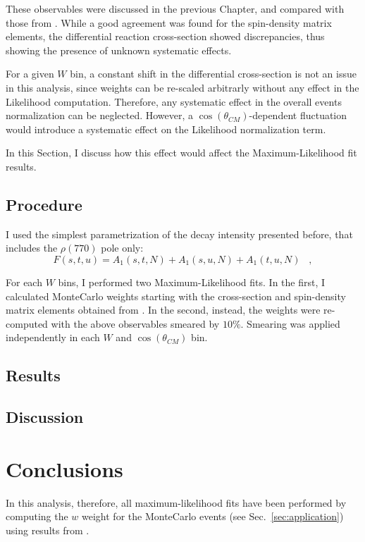 \documentclass[a4paper,10pt]{report}
\begin{document}
These observables were discussed in the previous Chapter, and compared with those from \cite{Williams:2009ab}. While a good agreement was found for the spin-density matrix elements, the differential reaction cross-section showed discrepancies, thus showing the presence of
unknown systematic effects.

For a given $W$ bin, a constant shift in the differential cross-section is not an issue in this analysis, since weights can be re-scaled arbitrarly without any effect in the Likelihood
computation. Therefore, any systematic effect in the overall events normalization can be neglected. 
However, a $\cos(\theta_{CM})$-dependent fluctuation would introduce a systematic effect on the Likelihood normalization term. 

In this Section, I discuss how this effect would affect the Maximum-Likelihood fit results.

\subsection{Procedure}

I used the simplest parametrization of the decay intensity presented before, that includes the $\rho(770)$ pole only:
\begin{equation}
F(s,t,u)=A_1(s,t,N)+A_1(s,u,N)+A_1(t,u,N) \; \; \; ,
\end{equation}

For each $W$ bins, I performed two Maximum-Likelihood fits. In the first, I calculated MonteCarlo weights starting with the cross-section and spin-density matrix elements obtained from \cite{Williams:2009ab}.
In the second, instead, the weights were re-computed with the above observables smeared by $10\%$. Smearing was applied independently in each $W$ and $\cos(\theta_{CM})$ bin.

\subsection{Results}


\subsection{Discussion}
\section{Conclusions}



In this analysis, therefore, all maximum-likelihood fits have been performed by computing the $w$ weight for the MonteCarlo events (see Sec.~\ref{sec:application}) using results from \cite{Williams:2009ab}.
\end{document}
